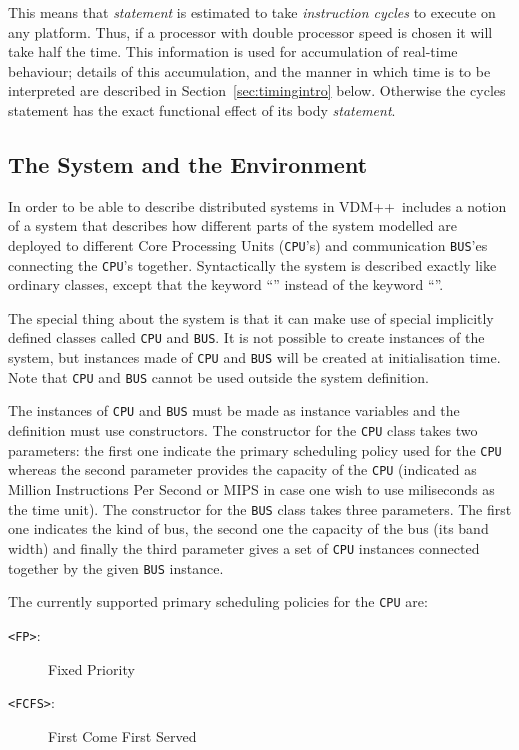 \documentclass{overturerepchap}
\newcommand{\keyw}[1]{{\bf\ttfamily{#1}}}
\newcommand{\vdmpp}{VDM++} %
\begin{document}
This means that \emph{statement} is estimated to take
\emph{instruction cycles} to execute on any platform. Thus, if a
processor with double processor speed is chosen it will take half the
time. This information is used for accumulation of real-time
behaviour; details of this accumulation, and the manner in which time
is to be interpreted are described in Section~\ref{sec:timingintro}
below.  Otherwise the cycles statement has the exact functional
effect of its body \textit{statement}.

\subsection{The System and the Environment}

In order to be able to describe distributed systems in \vdmpp\
includes a notion of a system that describes how different parts of
the system modelled are deployed to different Core Processing Units
(\texttt{CPU}'s) and communication \texttt{BUS}'es 
connecting the \texttt{CPU}'s
together. Syntactically the system is described exactly like ordinary
classes, except that the keyword ``\keyw{system}'' instead of the
keyword ``\keyw{class}''.

The special thing about the system is that it can make use of special
implicitly defined classes called \texttt{CPU} and \texttt{BUS}. It is 
not possible to create instances of the system, but instances made of
\texttt{CPU} and \texttt{BUS} will be created at initialisation time. 
Note that \texttt{CPU} and \texttt{BUS} cannot be used outside the
system definition.

The instances of \texttt{CPU} and \texttt{BUS} must be made as instance 
variables and the definition must use constructors. The constructor for the
\texttt{CPU} class takes two parameters: the first one indicate the 
primary scheduling policy used for the \texttt{CPU} whereas the second 
parameter provides the capacity of the \texttt{CPU} (indicated as Million
Instructions Per Second or MIPS in case one wish to use miliseconds as the
time unit). The constructor for the \texttt{BUS}
class takes three parameters. The first one indicates the kind of bus, the
second one the capacity of the bus (its band width) and finally the third 
parameter gives a set of \texttt{CPU} instances connected together by the
given \texttt{BUS} instance.

The currently supported primary scheduling policies for the \texttt{CPU}
are:
\begin{description}
\item[\texttt{<FP>}:] Fixed Priority
\item[\texttt{<FCFS>}:] First Come First Served
\end{description} 
\end{document}
